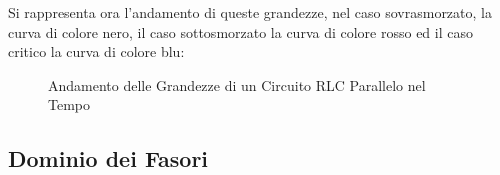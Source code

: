 \documentclass{article}
\numberwithin{equation}{subsection}
\begin{document}
Si rappresenta ora l'andamento di queste grandezze, nel caso sovrasmorzato, la curva di colore nero, il caso sottosmorzato la curva di colore rosso ed il caso critico la curva 
di colore blu: 
\begin{figure}[H]%
    \centering
    \qquad
    \caption{Andamento delle Grandezze di un Circuito RLC Parallelo nel Tempo}
    \label{fig:andamento-rlc-parellelo}
\end{figure}

\subsection{Dominio dei Fasori}
\end{document}
